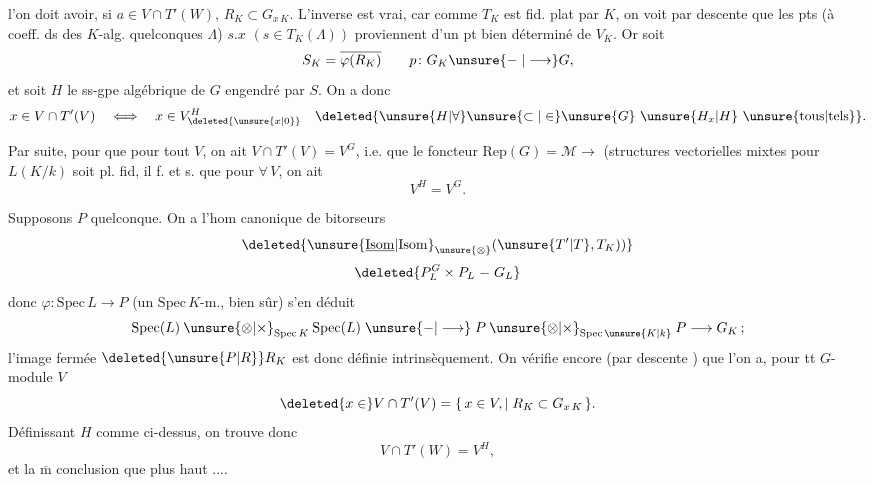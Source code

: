 l'on doit avoir, si $a\in V\cap T'(W)$, $R_K\subset G_{x\,K}$. L'inverse est vrai, car comme $T_K$ est fid. plat par $K$, on voit par descente que les pts (à coeff. ds des $K$-alg. quelconques $\Lambda$) $s.x$ $(s\in T_K(\Lambda))$ proviennent d'un pt bien déterminé de $V_K$. Or soit \deleted{\unsure{$\xi$}}
\[
S_K=\overline{\varphi(R_K)}\qquad p\colon G_K\unsure{\mathrel{-}|\longrightarrow}G,
\]
et soit $H$ le ss-gpe algébrique  de $G$ engendré par $S$. On a donc
\[
x\in V\cap T'(V)\quad\Longleftrightarrow\quad x\in V_{\deleted{\unsure{x|0}}}^{H}\quad \deleted{\unsure{H|\forall}\unsure{\subset|\in}\unsure{G}\ \unsure{H_x|H}\ \text{\unsure{tous|tels}}}.
\]

Par suite, pour que  pour tout $V$, on ait $V\cap T'(V)=V^G$, i.e. que le foncteur $\mathrm{Rep}(G)=\mathcal M\longrightarrow$ (structures vectorielles mixtes pour $L(K/k)$ soit pl. fid, il f. et s. que pour $\forall\,V$,  on ait
\[
V^H=V^G.
\]

Supposons $P$ quelconque. On a l'hom canonique de bitorseurs
\[
\deleted{\unsure{\underline{\mathrm{Isom}}|{\mathrm{Isom}}}_{\unsure{\otimes}}(\unsure{T'|T},T_K))}
\]
\[
\deleted{P_L^G\times P_L\mathrel{-}G_L}
\]
donc $\varphi\colon\mathrm{Spec}\,L\longrightarrow P$ (un $\mathrm{Spec}\,K$-m., bien sûr) s'en déduit 
\[
\mathrm{Spec}(L)\mathbin{\unsure{\otimes|\times}}_{\mathrm{Spec}\,K}\mathrm{Spec}(L)\mathrel{\unsure{-|\longrightarrow}}
P\mathbin{\unsure{\otimes|\times}}_{\mathrm{Spec}\,\unsure{K|k}}P\longrightarrow G_K\,;
\]
l'image fermée $\deleted{\unsure{P|R}}R_K$ est donc définie intrinsèquement. On vérifie encore (par descente ) que  l'on a, pour tt $G$-module $V$
\[
\deleted{x\in}V\cap T'(V)=\{\,x\in V,\mid R_K\subset G_{x\,K}\,\}.
\]
Définissant $H$ comme ci-dessus, on trouve donc
\[
V\cap T'(W)=V^H,
\]
et la $\overline{\mathrm m}$ conclusion que plus haut ....
{\centering \textsc{}\\
\textit{ }\par}

